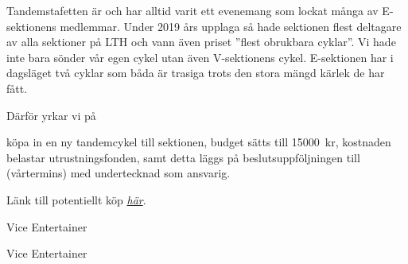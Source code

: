\documentclass[../_main/handlingar.tex]{subfiles}
\begin{document}

Tandemstafetten är och har alltid varit ett evenemang som lockat många av E-sektionens
medlemmar. Under 2019 års upplaga så hade sektionen flest deltagare av alla sektioner på
LTH och vann även priset ”flest obrukbara cyklar”. Vi hade inte bara sönder vår egen cykel
utan även V-sektionens cykel. E-sektionen har i dagsläget två cyklar som båda är trasiga trots
den stora mängd kärlek de har fått.


Därför yrkar vi på
\begin{attsatser}
    \att köpa in en ny tandemcykel till sektionen,
    \att budget sätts till \SI{15000}{kr},
    \att kostnaden belastar utrustningsfonden, samt
    \att detta läggs på beslutsuppföljningen till (vårtermins) med undertecknad som ansvarig.
\end{attsatser}

Länk till potentiellt köp \href{https://www.sportfritid.se/monark-tandem-3-vxl.html}{\textit{här}}.

\begin{signatures}{2}
    \mvh
    \signature{Simon Mahdavi}{Vice Entertainer}
    \signature{Casper Schwerin}{Vice Entertainer}
\end{signatures}
\end{document}
